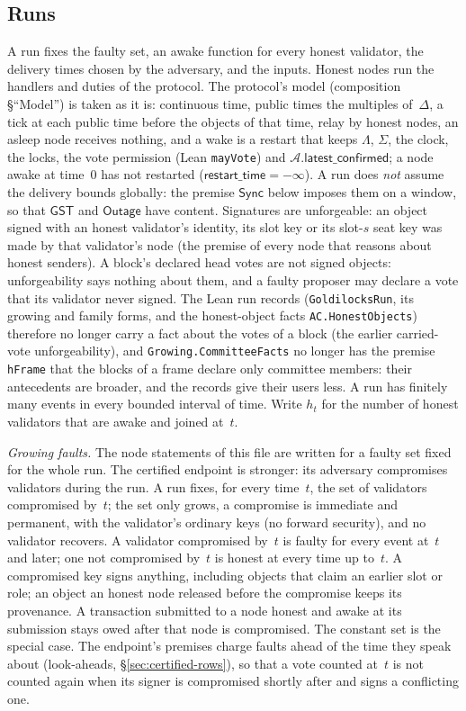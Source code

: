 \documentclass{article}
\newcommand{\AC}{\mathcal A}
\newcommand{\latestConfirmed}{\mathsf{latest\_confirmed}}
\begin{document}
\subsection{Runs}

A run fixes the faulty set, an awake function for every honest validator, the
delivery times chosen by the adversary, and the inputs.  Honest nodes run the
handlers and duties of the protocol.  The protocol's model
(composition \S``Model'') is taken as it is: continuous time, public times the
multiples of~$\Delta$, a tick at each public time before the objects of that
time, relay by honest nodes, an asleep node receives nothing, and a wake is
a restart that keeps $\Lambda$, $\Sigma$, the clock, the locks, the vote
permission (Lean \texttt{mayVote}) and
$\AC.\latestConfirmed$; a node awake at time~$0$ has not restarted
($\mathsf{restart\_time}=-\infty$).  A run does \emph{not} assume the delivery
bounds globally: the premise $\mathsf{Sync}$ below imposes them on a window, so that
$\mathsf{GST}$ and $\mathsf{Outage}$ have content.  Signatures are
unforgeable: an object signed with an honest validator's identity, its slot
key or its slot-$s$ seat key was made by that validator's node (the premise of every node that reasons
about honest senders).  A block's declared head votes are not signed
objects: unforgeability says nothing about them, and a faulty proposer may
declare a vote that its validator never signed.  The Lean run records
(\texttt{GoldilocksRun}, its growing and family forms, and the honest-object
facts \texttt{AC.HonestObjects}) therefore no longer carry a fact about the
votes of a block (the earlier carried-vote unforgeability), and
\texttt{Growing.CommitteeFacts} no longer has the premise \texttt{hFrame} that
the blocks of a frame declare only committee members: their antecedents are
broader, and the records give their users less.  A run has finitely many events in every bounded
interval of time.  Write $h_t$ for the number of honest validators that are
awake and joined at~$t$.

\emph{Growing faults.}  The node statements of this file are written for a
faulty set fixed for the whole run.  The certified endpoint is stronger: its
adversary compromises validators during the run.  A run fixes, for every
time~$t$, the set of validators compromised by~$t$; the set only grows, a
compromise is immediate and permanent, with the validator's ordinary keys
(no forward security), and no validator recovers.  A validator compromised
by~$t$ is faulty for every event at~$t$ and later; one not compromised
by~$t$ is honest at every time up to~$t$.  A compromised key signs anything,
including objects that claim an earlier slot or role; an object an honest
node released before the compromise keeps its provenance.  A transaction
submitted to a node honest and awake at its submission stays owed after
that node is compromised.  The constant set is the special case.  The
endpoint's premises charge faults ahead of the time they speak about
(look-aheads, \S\ref{sec:certified-rows}), so that a vote counted at~$t$
is not counted again when its signer is compromised shortly after and signs
a conflicting one.
\end{document}
